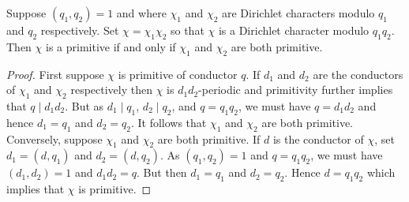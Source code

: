     \begin{proposition}\label{prop:primitive_characters_multiplicative_relatively_prime}
      Suppose $(q_{1},q_{2}) = 1$ and where $\chi_{1}$ and $\chi_{2}$ are Dirichlet characters modulo $q_{1}$ and $q_{2}$ respectively. Set $\chi = \chi_{1}\chi_{2}$ so that $\chi$ is a Dirichlet character modulo $q_{1}q_{2}$. Then $\chi$ is a primitive if and only if $\chi_{1}$ and $\chi_{2}$ are both primitive.
    \end{proposition}
    \begin{proof}
      First suppose $\chi$ is primitive of conductor $q$. If $d_{1}$ and $d_{2}$ are the conductors of $\chi_{1}$ and $\chi_{2}$ respectively then $\chi$ is $d_{1}d_{2}$-periodic and primitivity further implies that $q \mid d_{1}d_{2}$. But as $d_{1} \mid q_{1}$, $d_{2} \mid q_{2}$, and $q = q_{1}q_{2}$, we must have $q = d_{1}d_{2}$ and hence $d_{1} = q_{1}$ and $d_{2} = q_{2}$. It follows that $\chi_{1}$ and $\chi_{2}$ are both primitive. Conversely, suppose $\chi_{1}$ and $\chi_{2}$ are both primitive. If $d$ is the conductor of $\chi$, set $d_{1} = (d,q_{1})$ and $d_{2} = (d,q_{2})$. As $(q_{1},q_{2}) = 1$ and $q = q_{1}q_{2}$, we must have $(d_{1},d_{2}) = 1$ and $d_{1}d_{2} = q$. But then $d_{1} = q_{1}$ and $d_{2} = q_{2}$. Hence $d = q_{1}q_{2}$ which implies that $\chi$ is primitive.
    \end{proof}
    
